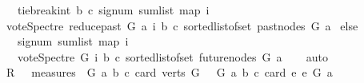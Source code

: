 \begin{isabellebody}
\ \ \ {\isacharparenleft}{\kern0pt}tie{\isacharunderscore}{\kern0pt}break{\isacharunderscore}{\kern0pt}int\ b\ c\ {\isacharparenleft}{\kern0pt}signum\ {\isacharparenleft}{\kern0pt}sum{\isacharunderscore}{\kern0pt}list\ {\isacharparenleft}{\kern0pt}map\ {\isacharparenleft}{\kern0pt}{\isasymlambda}i{\isachardot}{\kern0pt}\isanewline
\ {\isacharparenleft}{\kern0pt}vote{\isacharunderscore}{\kern0pt}Spectre\ {\isacharparenleft}{\kern0pt}reduce{\isacharunderscore}{\kern0pt}past\ G\ a{\isacharparenright}{\kern0pt}\ i\ b\ c{\isacharparenright}{\kern0pt}{\isacharparenright}{\kern0pt}\ {\isacharparenleft}{\kern0pt}sorted{\isacharunderscore}{\kern0pt}list{\isacharunderscore}{\kern0pt}of{\isacharunderscore}{\kern0pt}set\ {\isacharparenleft}{\kern0pt}past{\isacharunderscore}{\kern0pt}nodes\ G\ a{\isacharparenright}{\kern0pt}{\isacharparenright}{\kern0pt}{\isacharparenright}{\kern0pt}{\isacharparenright}{\kern0pt}{\isacharparenright}{\kern0pt}{\isacharparenright}{\kern0pt}\isanewline
\ else\ \isanewline
\ \ \ signum\ {\isacharparenleft}{\kern0pt}sum{\isacharunderscore}{\kern0pt}list\ {\isacharparenleft}{\kern0pt}map\ {\isacharparenleft}{\kern0pt}{\isasymlambda}i{\isachardot}{\kern0pt}\isanewline
\ \ \ {\isacharparenleft}{\kern0pt}vote{\isacharunderscore}{\kern0pt}Spectre\ G\ i\ b\ c{\isacharparenright}{\kern0pt}{\isacharparenright}{\kern0pt}\ {\isacharparenleft}{\kern0pt}sorted{\isacharunderscore}{\kern0pt}list{\isacharunderscore}{\kern0pt}of{\isacharunderscore}{\kern0pt}set\ {\isacharparenleft}{\kern0pt}future{\isacharunderscore}{\kern0pt}nodes\ G\ a{\isacharparenright}{\kern0pt}{\isacharparenright}{\kern0pt}{\isacharparenright}{\kern0pt}{\isacharparenright}{\kern0pt}{\isacharparenright}{\kern0pt}{\isachardoublequoteclose}\isanewline
%
\isadelimproof
\ \ %
\endisadelimproof
%
\isatagproof
{}\isamarkupfalse%
\ auto%
\endisatagproof
{\isafoldproof}%
%
\isadelimproof
\isanewline
%
\endisadelimproof
{}\isamarkupfalse%
\isanewline
%
\isadelimproof
%
\endisadelimproof
%
\isatagproof
{}\isamarkupfalse%
\isanewline
\ \ \isamarkupfalse%
\ {\isacharquery}{\kern0pt}R\ {\isacharequal}{\kern0pt}\ {\isachardoublequoteopen}\ measures\ {\isacharbrackleft}{\kern0pt}{\isacharparenleft}{\kern0pt}\ {\isasymlambda}{\isacharparenleft}{\kern0pt}G{\isacharcomma}{\kern0pt}\ a{\isacharcomma}{\kern0pt}\ b{\isacharcomma}{\kern0pt}\ c{\isacharparenright}{\kern0pt}{\isachardot}{\kern0pt}\ {\isacharparenleft}{\kern0pt}card\ {\isacharparenleft}{\kern0pt}verts\ G{\isacharparenright}{\kern0pt}{\isacharparenright}{\kern0pt}{\isacharparenright}{\kern0pt}{\isacharcomma}{\kern0pt}\ \ {\isacharparenleft}{\kern0pt}\ {\isasymlambda}{\isacharparenleft}{\kern0pt}G{\isacharcomma}{\kern0pt}\ a{\isacharcomma}{\kern0pt}\ b{\isacharcomma}{\kern0pt}\ c{\isacharparenright}{\kern0pt}{\isachardot}{\kern0pt}\ card\ {\isacharbraceleft}{\kern0pt}e{\isachardot}{\kern0pt}\ e\ {\isasymrightarrow}\isactrlsup {\isacharasterisk}{\kern0pt}\isactrlbsub G\isactrlesub \ a{\isacharbraceright}{\kern0pt}{\isacharparenright}{\kern0pt}{\isacharbrackright}{\kern0pt}{\isachardoublequoteclose}\ \ \isanewline

\end{isabellebody}
